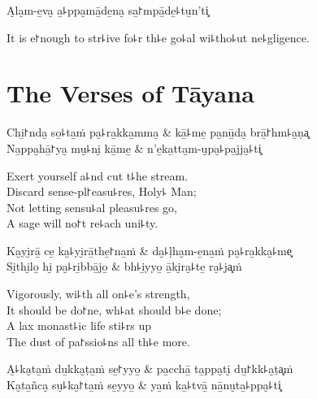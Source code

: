 A̮la̮m-e̱va̮ a̱꜕ppa̮mā̱de̱na̮ sa̱꜓mpā̱de̱꜕tu̱n'ti͓

\begin{english}
  It is e꜓nough to str꜕ive fo꜕r th꜕e go꜕al wi꜕tho꜕ut ne꜕gligence.
\end{english}

\chapter{The Verses of Tāyana}


\begin{leader}
\end{leader}

\begin{twochants}
  Chi̱꜓nda̮ so̱꜕ta̱ṁ pa̮꜕ra̱kka̱mma̮ & kā̱꜕me̱ pa̮nū̱da̮ brā̱꜓hm꜕a̮ṇa͓ \\
  Na̱ppa̮hā̱꜓ya̮ mu̮꜕ni̮ kā̱me̱ & n'e̱ka̱tta̮m-u̮pa̮꜕pa̱jja̮꜕ti͓ \\
\end{twochants}

\begin{english}
  Exert yourself a꜕nd cut t꜕he stream.\\
  Discard sense-pl꜓easu꜕res, Holy꜕ Man;\\
  Not letting sensu꜕al pleasu꜕res go,\\
  A sage will no꜓t re꜕ach uni꜕ty.
\end{english}

\begin{twochants}
  Ka̮yi̮rā̱ ce̱ ka̮꜕yi̮rā̱the̱꜓na̱ṁ & da̮꜕ḷha̮m-e̱na̱ṁ pa̮꜕ra̱kka̮꜕me͓ \\
  Si̮thi̮lo̱ hi̮ pa̮꜕ri̱bbā̱jo̱ & bh꜕i̱yyo̱ ā̱ki̮ra̮꜕te̱ ra̮꜕ja͓ṁ \\
\end{twochants}

\begin{english}
  Vigorously, wi꜕th all on꜕e's strength,\\
  It should be do꜓ne, wh꜕at should b꜕e done;\\
  A lax monast꜕ic life sti꜕rs up\\
  The dust of pa꜓ssio꜕ns all th꜕e more.
\end{english}

\begin{twochants}
  A̮꜕ka̮ta̱ṁ du̱kka̮ṭa̱ṁ se̱꜓yyo̱ & pa̱cchā̱ ta̱ppa̮ti̮ du̱꜓kk꜕a̮ṭa͓ṁ \\
  Ka̮ta̱ñca̮ su̮꜕ka̮꜓ta̱ṁ se̱yyo̱ & ya̱ṁ ka̱꜕tvā̱ nā̱nu̮ta̱꜕ppa̮꜕ti͓ \\
\end{twochants}

